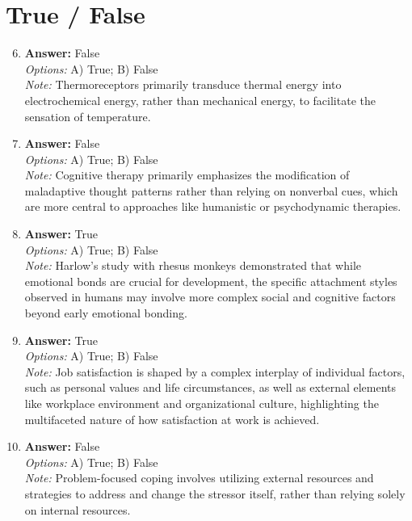 \documentclass[12pt]{article}
\begin{document}
\section*{True / False}
\begin{enumerate}[label=\arabic*.]
\setcounter{enumi}{5}
\item \textbf{Answer:} False
\\ \textit{Options:} A) True; B) False
\\ \textit{Note:} Thermoreceptors primarily transduce thermal energy into electrochemical energy, rather than mechanical energy, to facilitate the sensation of temperature.
\item \textbf{Answer:} False
\\ \textit{Options:} A) True; B) False
\\ \textit{Note:} Cognitive therapy primarily emphasizes the modification of maladaptive thought patterns rather than relying on nonverbal cues, which are more central to approaches like humanistic or psychodynamic therapies.
\item \textbf{Answer:} True
\\ \textit{Options:} A) True; B) False
\\ \textit{Note:} Harlow's study with rhesus monkeys demonstrated that while emotional bonds are crucial for development, the specific attachment styles observed in humans may involve more complex social and cognitive factors beyond early emotional bonding.
\item \textbf{Answer:} True
\\ \textit{Options:} A) True; B) False
\\ \textit{Note:} Job satisfaction is shaped by a complex interplay of individual factors, such as personal values and life circumstances, as well as external elements like workplace environment and organizational culture, highlighting the multifaceted nature of how satisfaction at work is achieved.
\item \textbf{Answer:} False
\\ \textit{Options:} A) True; B) False
\\ \textit{Note:} Problem-focused coping involves utilizing external resources and strategies to address and change the stressor itself, rather than relying solely on internal resources.
\end{enumerate}
\end{document}
